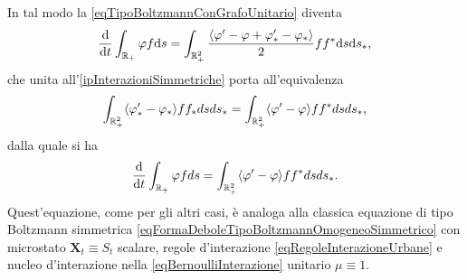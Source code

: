                 In tal modo la \eqref{eqTipoBoltzmannConGrafoUnitario} diventa
                \begin{equation*}
                    \frac{\mathrm{d}}{\mathrm{d}t}\int_{\mathbb R_+}\varphi f\mathrm{d} s=\int_{\mathbb R_+^2}
                    \frac{\langle\varphi'-\varphi+\varphi'_*-\varphi_*\rangle}2
                    ff^*\mathrm{d} s\mathrm{d} s_*,
                \end{equation*}
                che unita all'\ref{ipInterazioniSimmetriche} porta all'equivalenza
                \begin{equation*}
                    \int_{\mathbb R_+^2}
                    \langle\varphi_*'-\varphi_*\rangle ff_*dsds_*
                    =\int_{\mathbb R_+^2}
                    \langle\varphi'-\varphi\rangle ff^*dsds_*,
                \end{equation*}
                dalla quale si ha
                \begin{equation*}
                    \frac{\mathrm{d}}{\mathrm{d}t}\int_{\mathbb R_+}\varphi fds=
                    \int_{\mathbb R_+^2}
                    \langle\varphi'-\varphi\rangle ff^*dsds_*.
                \end{equation*}
                Quest'equazione, come per gli altri casi, è analoga alla classica equazione di tipo Boltzmann simmetrica \cref{eqFormaDeboleTipoBoltzmannOmogeneoSimmetrico} con microstato \(\mathbf X_t\equiv S_t\) scalare, regole d'interazione \ref{eqRegoleInterazioneUrbane} e nucleo d'interazione nella \ref{eqBernoulliInterazione} unitario \(\mu\equiv1\).%
